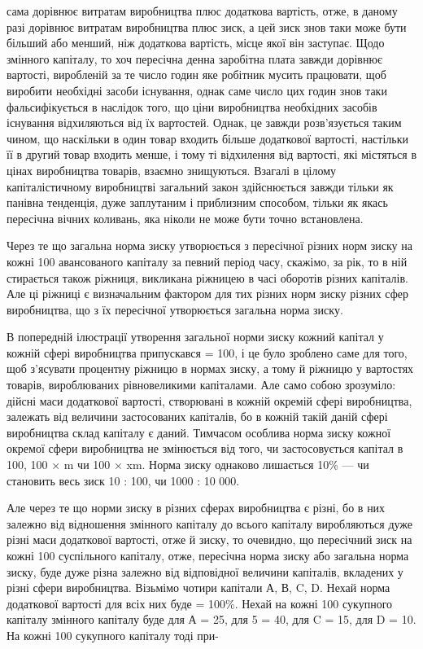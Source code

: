 сама дорівнює витратам виробництва плюс додаткова вартість,
отже, в даному разі дорівнює витратам виробництва плюс зиск,
а цей зиск знов таки може бути більший або менший, ніж додаткова вартість, місце якої він заступає.
Щодо змінного капіталу, то хоч пересічна денна заробітна плата завжди дорівнює вартості, виробленій
за те число годин яке робітник
мусить працювати, щоб виробити необхідні засоби існування,
однак саме число цих годин знов таки фальсифікується в наслідок того, що ціни виробництва необхідних
засобів існування
відхиляються від їх вартостей. Однак, це завжди розв’язується
таким чином, що наскільки в один товар входить більше додаткової вартості, настільки її в другий
товар входить менше,
і тому ті відхилення від вартості, які містяться в цінах виробництва товарів, взаємно знищуються.
Взагалі в цілому капіталістичному виробництві загальний закон здійснюється завжди
тільки як панівна тенденція, дуже заплутаним і приблизним
способом, тільки як якась пересічна вічних коливань, яка ніколи
не може бути точно встановлена.

Через те що загальна норма зиску утворюється з пересічної
різних норм зиску на кожні 100 авансованого капіталу за певний
період часу, скажімо, за рік, то в ній стирається також ріжниця,
викликана ріжницею в часі оборотів різних капіталів. Але ці
ріжниці є визначальним фактором для тих різних норм зиску
різних сфер виробництва, що з їх пересічної утворюється загальна норма зиску.

В попередній ілюстрації утворення загальної норми зиску
кожний капітал у кожній сфері виробництва припускався = 100,
і це було зроблено саме для того, щоб з’ясувати процентну
ріжницю в нормах зиску, а тому й ріжницю у вартостях товарів,
вироблюваних рівновеликими капіталами. Але само собою зрозуміло: дійсні маси додаткової вартості,
створювані в кожній
окремій сфері виробництва, залежать від величини застосованих
капіталів, бо в кожній такій даній сфері виробництва склад капіталу є даний. Тимчасом особлива норма
зиску кожної окремої
сфери виробництва не змінюється від того, чи застосовується
капітал в 100, 100 × m чи 100 × xm. Норма зиску однаково лишається 10\% — чи становить весь зиск 10 :
100, чи 1000 : 10 000.

Але через те що норми зиску в різних сферах виробництва
є різні, бо в них залежно від відношення змінного капіталу до
всього капіталу виробляються дуже різні маси додаткової вартості, отже й зиску, то очевидно, що
пересічний зиск на кожні
100 суспільного капіталу, отже, пересічна норма зиску або загальна норма зиску, буде дуже різна
залежно від відповідної
величини капіталів, вкладених у різні сфери виробництва. Візьмімо чотири капітали А, В, C, D. Нехай
норма додаткової вартості для всіх них буде = 100\%. Нехай на кожні 100 сукупного
капіталу змінного капіталу буде для А = 25, для 5 = 40, для
C = 15, для D = 10. На кожні 100 сукупного капіталу тоді при-
